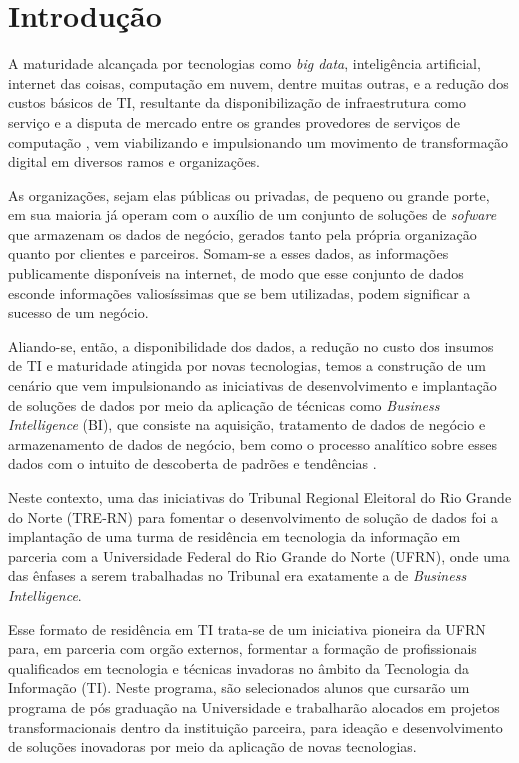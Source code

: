 
\section{Introdução}
A maturidade alcançada por tecnologias como \textit{big data}, inteligência artificial, internet das coisas, computação em nuvem, dentre muitas outras, e a redução dos custos básicos de TI, resultante da disponibilização de infraestrutura como serviço e a disputa de mercado entre os grandes provedores de serviços de computação \cite{infraPriceDrop}, vem viabilizando e impulsionando um movimento de transformação digital em diversos ramos e organizações.

As organizações, sejam elas públicas ou privadas, de pequeno ou grande porte, em sua maioria já operam com o auxílio de um conjunto de soluções de \textit{sofware} que armazenam os dados de negócio, gerados tanto pela própria organização quanto por clientes e parceiros. Somam-se a esses dados, as informações publicamente disponíveis na internet, de modo que esse conjunto de dados esconde informações valiosíssimas que se bem utilizadas, podem significar a sucesso de um negócio. 

Aliando-se, então, a disponibilidade dos dados, a redução no custo dos insumos de TI e maturidade atingida por novas tecnologias, temos a construção de um cenário que vem impulsionando as iniciativas de desenvolvimento e implantação de soluções de dados por meio da aplicação de técnicas como \textit{Business Intelligence} (BI), que consiste na aquisição, tratamento de dados de negócio e armazenamento de dados de negócio, bem como o processo analítico sobre esses dados com o intuito de descoberta de padrões e tendências \cite{BIDef}.

Neste contexto, uma das iniciativas do Tribunal Regional Eleitoral do Rio Grande do Norte (TRE-RN) para fomentar o desenvolvimento de solução de dados foi a implantação de uma turma de residência em tecnologia da informação em parceria com a Universidade Federal do Rio Grande do Norte (UFRN), onde uma das ênfases a serem trabalhadas no Tribunal era exatamente a de \textit{Business Intelligence}. 

Esse formato de residência em TI trata-se de um iniciativa pioneira da UFRN para, em parceria com orgão externos, formentar a formação de profissionais qualificados em tecnologia e técnicas invadoras no âmbito da Tecnologia da Informação (TI). Neste programa, são selecionados alunos que cursarão um programa de pós graduação na Universidade e trabalharão alocados em projetos transformacionais dentro da instituição parceira, para ideação e desenvolvimento de soluções inovadoras por meio da aplicação de novas tecnologias.

